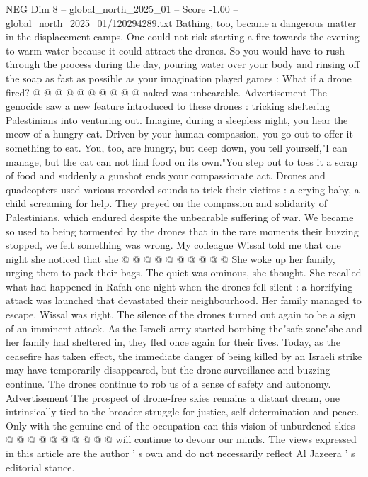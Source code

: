 \begin{textsample}{NEG Dim 8 – global\_north\_2025\_01 – Score -1.00 – global\_north\_2025\_01/120294289.txt}
Bathing, too, became a dangerous matter in the displacement camps.
One could not risk starting a fire towards the evening to warm water because it could attract the drones.
So you would have to rush through the process during the day, pouring water over your body and rinsing off the soap as fast as possible as your imagination played games : What if a drone fired? @ @ @ @ @ @ @ @ @ @ naked was unbearable.
Advertisement The genocide saw a new feature introduced to these drones : tricking sheltering Palestinians into venturing out.
Imagine, during a sleepless night, you hear the meow of a hungry cat.
Driven by your human compassion, you go out to offer it something to eat.
You, too, are hungry, but deep down, you tell yourself,"I can manage, but the cat can not find food on its own."You step out to toss it a scrap of food and suddenly a gunshot ends your compassionate act.
Drones and quadcopters used various recorded sounds to trick their victims : a crying baby, a child screaming for help.
They preyed on the compassion and solidarity of Palestinians, which endured despite the unbearable suffering of war.
We became so used to being tormented by the drones that in the rare moments their buzzing stopped, we felt something was wrong.
My colleague Wissal told me that one night she noticed that she @ @ @ @ @ @ @ @ @ @ She woke up her family, urging them to pack their bags.
The quiet was ominous, she thought.
She recalled what had happened in Rafah one night when the drones fell silent : a horrifying attack was launched that devastated their neighbourhood.
Her family managed to escape.
Wissal was right.
The silence of the drones turned out again to be a sign of an imminent attack.
As the Israeli army started bombing the"safe zone"she and her family had sheltered in, they fled once again for their lives.
Today, as the ceasefire has taken effect, the immediate danger of being killed by an Israeli strike may have temporarily disappeared, but the drone surveillance and buzzing continue.
The drones continue to rob us of a sense of safety and autonomy.
Advertisement The prospect of drone-free skies remains a distant dream, one intrinsically tied to the broader struggle for justice, self-determination and peace.
Only with the genuine end of the occupation can this vision of unburdened skies @ @ @ @ @ @ @ @ @ @ will continue to devour our minds.
The views expressed in this article are the author ' s own and do not necessarily reflect Al Jazeera ' s editorial stance.

\end{textsample}
